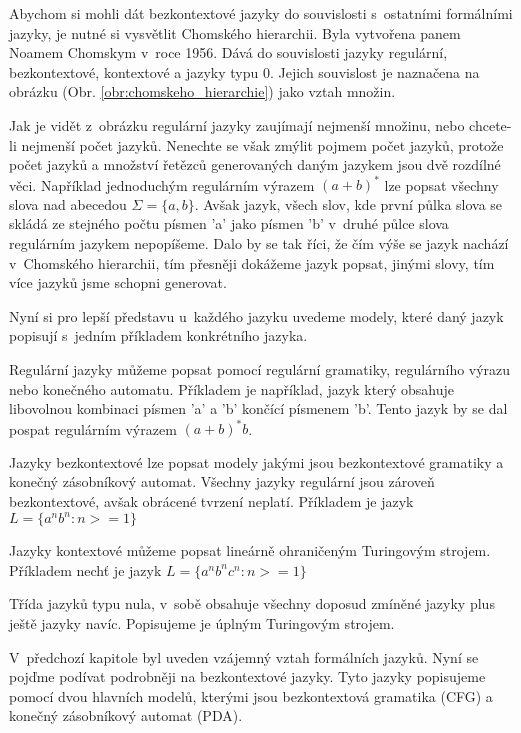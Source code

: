 Abychom si mohli dát bezkontextové jazyky do souvislosti s~ostatními formálními jazyky, je nutné si vysvětlit Chomského hierarchii. Byla vytvořena panem Noamem Chomskym v~roce 1956. Dává do souvislosti jazyky regulární, bezkontextové, kontextové a jazyky typu 0. Jejich souvislost je naznačena na obrázku (Obr. \ref{obr:chomskeho_hierarchie}) jako vztah množin.


Jak je vidět z~obrázku regulární jazyky zaujímají nejmenší množinu, nebo chcete-li nejmenší počet jazyků. Nenechte se však zmýlit pojmem  počet jazyků, protože počet jazyků a množství řetězců generovaných daným jazykem jsou dvě rozdílné věci. Například jednoduchým regulárním výrazem \( (a + b)^* \) lze popsat všechny slova nad abecedou \( \Sigma = \{a, b\} \). Avšak jazyk, všech slov, kde první půlka slova se skládá ze stejného počtu písmen 'a' jako písmen 'b' v~druhé půlce slova regulárním jazykem nepopíšeme. Dalo by se tak říci, že čím výše se jazyk nachází v~Chomského hierarchii, tím přesněji dokážeme jazyk popsat, jinými slovy, tím více jazyků jsme schopni generovat.

Nyní si pro lepší představu u~každého jazyku uvedeme modely, které daný jazyk popisují s~jedním příkladem konkrétního jazyka.

Regulární jazyky můžeme popsat pomocí regulární gramatiky, regulárního výrazu nebo konečného automatu. Příkladem je například, jazyk který obsahuje libovolnou kombinaci písmen 'a' a 'b' končící písmenem 'b'. Tento jazyk by se dal pospat regulárním výrazem \( (a + b)^* b \). 

Jazyky bezkontextové lze popsat modely jakými jsou bezkontextové gramatiky a konečný zásobníkový automat. Všechny jazyky regulární jsou zároveň bezkontextové, avšak obrácené tvrzení neplatí. Příkladem je jazyk \( L = \{ a^n b^n : n >= 1 \}  \)

Jazyky kontextové můžeme popsat lineárně ohraničeným Turingovým strojem. Příkladem nechť je jazyk \( L = \{ a^n b^n c^n : n >= 1 \}  \)

Třída jazyků typu nula, v~sobě obsahuje všechny doposud zmíněné jazyky plus ještě jazyky navíc. Popisujeme je úplným Turingovým strojem. 
\cite{Chomsky_hierarchy}

V~předchozí kapitole byl uveden vzájemný vztah formálních jazyků. Nyní se pojďme podívat podrobněji na bezkontextové jazyky. Tyto jazyky popisujeme pomocí dvou hlavních modelů, kterými jsou bezkontextová gramatika (CFG) a konečný zásobníkový automat (PDA).

